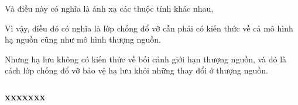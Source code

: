 \documentclass{article} %
\begin{document}








Và điều này có nghĩa là ánh xạ các thuộc tính khác nhau,

Vì vậy, điều đó có nghĩa là lớp chống đổ vỡ cần phải có kiến thức về cả mô hình hạ nguồn cũng như mô hình thượng nguồn.

Nhưng hạ lưu không có kiến thức về bối cảnh giới hạn thượng nguồn, và đó là cách lớp chống đổ vỡ bảo vệ hạ lưu khỏi những thay đổi ở thượng nguồn.

%
%


\subsubsection{xxxxxxx}
% 
\end{document}
